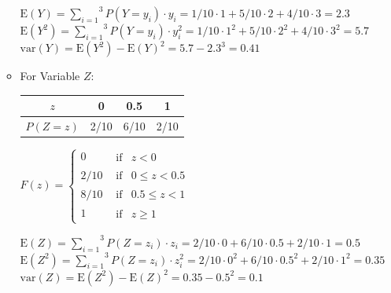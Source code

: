 \documentclass[12pt,thmsa]{article}
\begin{document}
\begin{enumerate}
\begin{itemize}
			\begin{center}
			$\mbox{E}(Y) = \overset{3}{\underset{i=1}{\sum}}P(Y=y_i)\cdot y_i = 1/10\cdot1 + 5/10\cdot 2 + 4/10\cdot3 = 2.3$ \\
			$\mbox{E}(Y^2) = \overset{3}{\underset{i=1}{\sum}}P(Y=y_i)\cdot y_i^2 = 1/10\cdot1^2 + 5/10\cdot 2^2 + 4/10\cdot3^2 = 5.7 $\\
			$\mbox{var}(Y) =  \mbox{E}(Y^2) - \mbox{E}(Y)^2 = 5.7 - 2.3^3 = 0.41$
			\end{center}
			\bigskip

\item 		For Variable $Z$:
			\begin{center}
			\begin{tabular}{|c|c|c|c|}
			\hline
			$z$ & 0 & 0.5 & 1 \\
			\hline
			$P(Z=z)$ & 2/10 & 6/10 & 2/10\\
			\hline
			\end{tabular}
			\end{center}

			\medskip
			\begin{center}
			$F(z)=\begin{cases}
			0 & \begin{array}{cc} \textrm{if} & z<0\end{array}\\
			2/10 & \begin{array}{cc} \textrm{if} & 0\leq z<0.5\end{array}\\
			8/10 & \begin{array}{cc}	\textrm{if} & 0.5\leq z<1\end{array}\\
			1 & \begin{array}{cc} \textrm{if} &  z\geq 1\end{array}
			\end{cases}$
			\end{center}

			\begin{center}
			$\mbox{E}(Z) = \overset{3}{\underset{i=1}{\sum}}P(Z=z_i)\cdot z_i = 2/10\cdot0 + 6/10\cdot0.5 + 2/10\cdot1 = 0.5$ \\
			$\mbox{E}(Z^2) = \overset{3}{\underset{i=1}{\sum}}P(Z=z_i)\cdot z_i^2 = 2/10\cdot0^2 + 6/10\cdot0.5^2 + 2/10\cdot1^2 = 0.35 $\\
			$\mbox{var}(Z) =  \mbox{E}(Z^2) - \mbox{E}(Z)^2 = 0.35 - 0.5^2 = 0.1$		
			\end{center}


\end{itemize}
\end{enumerate}
\end{document}
